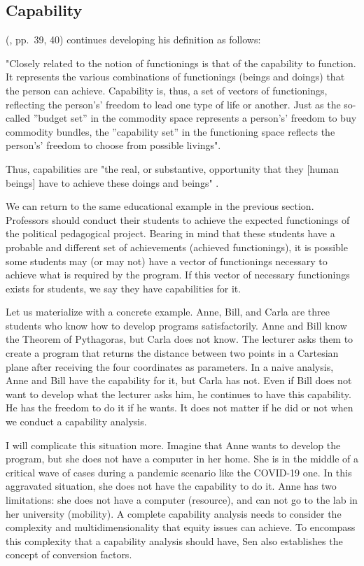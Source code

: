 \subsection{Capability}
\label{sen-ss:capability}

 (\citeyear{sen:1992}, pp.~39, 40) continues developing his definition as follows:
\begin{citacao}
    "Closely related to the notion of functionings is that of the capability to function. It represents the various combinations of functionings (beings and doings) that the person can achieve. Capability is, thus, a set of vectors of functionings, reflecting the person's' freedom to lead one type of life or another. Just as the so-called ''budget set'' in the commodity space represents a person's' freedom to buy commodity bundles, the ''capability set'' in the functioning space reflects the person's' freedom to choose from possible livings".    
\end{citacao}
Thus, capabilities are "the real, or substantive, opportunity that they [human beings] have to achieve these doings and beings" \cite{robeyns:2023}.

We can return to the same educational example in the previous section. Professors should conduct their students to achieve the expected functionings of the political pedagogical project. Bearing in mind that these students have a probable and different set of achievements (achieved functionings), it is possible some students may (or may not) have a vector of functionings necessary to achieve what is required by the program. If this vector of necessary functionings exists for students, we say they have capabilities for it.

Let us materialize with a concrete example. Anne, Bill, and Carla are three students who know how to develop programs satisfactorily. Anne and Bill know the Theorem of Pythagoras, but Carla does not know. The lecturer asks them to create a program that returns the distance between two points in a Cartesian plane after receiving the four coordinates as parameters. In a naive analysis, Anne and Bill have the capability for it, but Carla has not. Even if Bill does not want to develop what the lecturer asks him, he continues to have this capability. He has the freedom to do it if he wants. It does not matter if he did or not when we conduct a capability analysis.

I will complicate this situation more. Imagine that Anne wants to develop the program, but she does not have a computer in her home. She is in the middle of a critical wave of cases during a pandemic scenario like the \gls{COVID-19} one. In this aggravated situation, she does not have the capability to do it. Anne has two limitations: she does not have a computer (resource), and can not go to the lab in her university (mobility). A complete capability analysis needs to consider the complexity and multidimensionality that equity issues can achieve. To encompass this complexity that a capability analysis should have, Sen also establishes the concept of conversion factors.

